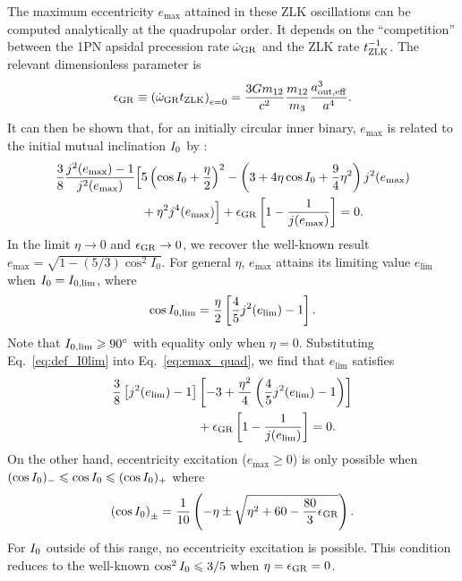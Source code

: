 \documentclass[
        fleqn,
        usenatbib,
    ]{mnras}
\newcommand*{\p}[1]{\left(#1\right)}
\newcommand*{\s}[1]{\left[#1\right]}
\begin{document}
The maximum eccentricity $e_{\max}$ attained in these ZLK oscillations can be
computed analytically at the quadrupolar order. It depends on the
``competition'' between the 1PN apsidal precession rate $\dot{\omega}_{\rm GR}$
and the ZLK rate $t_{\rm ZLK}^{-1}$. The relevant dimensionless parameter is
\begin{align}
    \epsilon_{\rm GR} \equiv \p{\dot{\omega}_{\rm GR} t_{\rm ZLK}}_{e = 0}
        = \frac{3Gm_{12}}{c^2} \frac{m_{12}}{m_3}\frac{a_{\rm out, eff}^3}{a^4}.
        \label{eq:def_epsgr}
\end{align}
It can then be shown that, for an initially circular inner binary, $e_{\max}$ is
related to the initial mutual inclination $I_{\rm 0}$ by \citep{LML15,
anderson2016formation}:
\begin{align}
    \frac{3}{8}\frac{j^2(e_{\max}) - 1}{j^2(e_{\max})}\Big[&
        5\p{\cos I_0 + \frac{\eta}{2}}^2
        - \p{3 + 4\eta \cos I_0 + \frac{9}{4}\eta^2}j^2(e_{\max})
            \nonumber\\
        &+ \eta^2 j^4(e_{\max})
    \Big] + \epsilon_{\rm GR}\s{1 - \frac{1}{j(e_{\max})}} = 0.
    \label{eq:emax_quad}
\end{align}
In the limit $\eta \to 0$ and $\epsilon_{\rm GR} \to 0$, we recover the
well-known result $e_{\max} = \sqrt{1 - (5/3) \cos^2 I_0}$. For general $\eta$,
$e_{\max}$ attains its limiting value $e_{\lim}$ when $I_{\rm 0} = I_{\rm 0,
\lim}$, where \citep[see also][]{hamers_tp}
\begin{align}
    \cos I_{\rm 0, \lim} = \frac{\eta}{2}\s{\frac{4}{5}j^2(e_{\lim}) -
        1}.\label{eq:def_I0lim}
\end{align}
Note that $I_{\rm 0, \lim} \geq 90^\circ$ with equality only when $\eta
= 0$. Substituting Eq.~\eqref{eq:def_I0lim} into Eq.~\eqref{eq:emax_quad}, we find
that $e_{\lim}$ satisfies
\begin{align}
    \frac{3}{8}\s{j^2(e_{\lim}) - 1}&\s{-3 + \frac{\eta^2}{4}
        \p{\frac{4}{5}j^2(e_{\lim}) - 1}}\nonumber\\
        &+ \epsilon_{\rm GR}\s{1 - \frac{1}{j(e_{\lim})}} = 0.
        \label{eq:def_elim}
\end{align}
On the other hand, eccentricity excitation ($e_{\max} \geq 0$) is only possible
when $(\cos I_{\rm 0})_- \leq \cos I_{\rm 0} \leq (\cos I_{\rm 0})_+$ where
\begin{align}
    \p{\cos I_{\rm 0}}_{\pm} = \frac{1}{10}\p{-\eta \pm \sqrt{\eta^2 + 60 -
        \frac{80}{3}\epsilon_{\rm GR}}}.\label{eq:I0bounds}
\end{align}
For $I_{\rm 0}$ outside of this range, no eccentricity excitation is possible.
This condition reduces to the well-known $\cos^2 I_{\rm 0} \leq 3/5$ when $\eta
= \epsilon_{\rm GR} = 0$.
\end{document}
